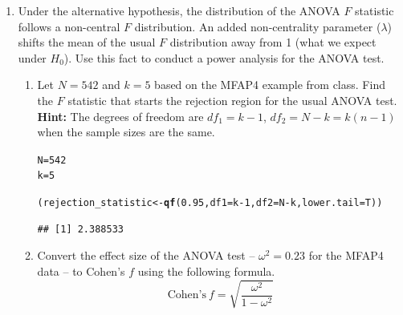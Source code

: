 \documentclass{article}\usepackage[]{graphicx}\usepackage[]{xcolor}
\makeatletter
\newcommand{\hlnum}[1]{\textcolor[rgb]{0.686,0.059,0.569}{#1}}%
\newcommand{\hlopt}[1]{\textcolor[rgb]{0,0,0}{#1}}%
\newcommand{\hldef}[1]{\textcolor[rgb]{0.345,0.345,0.345}{#1}}%
\newcommand{\hlkwb}[1]{\textcolor[rgb]{0.69,0.353,0.396}{#1}}%
\newcommand{\hlkwc}[1]{\textcolor[rgb]{0.333,0.667,0.333}{#1}}%
\newcommand{\hlkwd}[1]{\textcolor[rgb]{0.737,0.353,0.396}{\textbf{#1}}}%
\newenvironment{kframe}{%
 \def\at@end@of@kframe{}%
 \ifinner\ifhmode%
  \def\at@end@of@kframe{\end{minipage}}%
  \begin{minipage}{\columnwidth}%
 \fi\fi%
 \def\FrameCommand##1{\hskip\@totalleftmargin \hskip-\fboxsep
 \colorbox{shadecolor}{##1}\hskip-\fboxsep
     \hskip-\linewidth \hskip-\@totalleftmargin \hskip\columnwidth}%
 \MakeFramed {\advance\hsize-\width
   \@totalleftmargin\z@ \linewidth\hsize
   \@setminipage}}%
 {\par\unskip\endMakeFramed%
 \at@end@of@kframe}
\newenvironment{knitrout}{}{} %
\makeatother
\begin{document}
\begin{enumerate}
\textcolor{red}{As the sample size increases to $n = 1000$, the two methods are virtually identical in terms of $\alpha$ and Power. Students who used the LLM version of the calculation assumed that the LLM method would be approximately robust even with a low sample size, as the exact version is. This can be problematic as most datasets used in statistics are not as large as $n = 1000$, so the difference in $\alpha$ and power could make a difference in the hypothesis test.}
\item Under the alternative hypothesis, the distribution of the ANOVA $F$ 
statistic follows a non-central $F$ distribution. An added non-centrality 
parameter ($\lambda$) shifts the mean of the usual $F$ distribution away 
from 1 (what we expect under $H_0$). Use this fact to conduct a power analysis 
for the ANOVA test.
\begin{enumerate}
\item Let $N=542$ and $k=5$ based on the MFAP4 example from class. Find the 
$F$ statistic that starts the rejection region for the usual ANOVA test.\\
\textbf{Hint:} The degrees of freedom are $df_1=k-1$, $df_2=N-k=k(n-1)$when the sample sizes are the same.

\begin{knitrout}\scriptsize
{}\color{fgcolor}\begin{kframe}
\begin{alltt}
\hldef{N} \hlkwb{=} \hlnum{542}
\hldef{k} \hlkwb{=} \hlnum{5}

\hldef{(rejection_statistic} \hlkwb{<-} \hlkwd{qf}\hldef{(}\hlnum{0.95}\hldef{,} \hlkwc{df1} \hldef{= k}\hlopt{-}\hlnum{1}\hldef{,} \hlkwc{df2} \hldef{= N}\hlopt{-}\hldef{k,} \hlkwc{lower.tail} \hldef{= T))}
\end{alltt}
\begin{verbatim}
## [1] 2.388533
\end{verbatim}
\end{kframe}
\end{knitrout}
\item Convert the effect size of the ANOVA test -- $\omega^2 = 0.23$ for the 
MFAP4 data -- to Cohen's $f$ using the following formula.
\[\text{Cohen's}~f = \sqrt{\frac{\omega^2}{1-\omega^2}}\]


\end{enumerate}
\end{enumerate}
\end{document}
